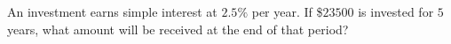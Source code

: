 An investment earns simple interest at $2.5\%$ per year. If \$$23500$ is invested for $5$ years, what amount will be received at the end of that period?
